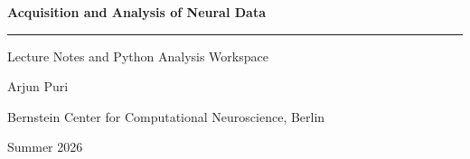 \begin{titlepage}
  \centering
  \vspace*{3cm}

  {\sffamily\Huge\bfseries Acquisition and Analysis of Neural Data}

  \vspace{0.6cm}
  {\rule{0.4\textwidth}{0.6pt}}

  \vspace{0.6cm}
  {\sffamily\Large Lecture Notes and Python Analysis Workspace}

  \vspace{2.5cm}
  {\large Arjun Puri}

  \vspace{0.4cm}
  {\normalsize Bernstein Center for Computational Neuroscience, Berlin}

  \vfill

  {\small Summer 2026}

  \vspace{1cm}
\end{titlepage}
